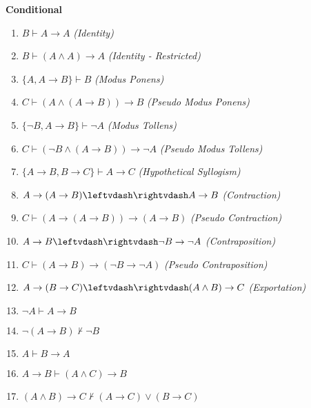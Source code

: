 
\noindent \textbf{Conditional}

\begin{enumerate}
\setcounter{enumi}{\value{enumi_saved}}
\item $ B\vdash  A \rightarrow  A $\hfill\emph{ (Identity)}  
\item $ B\vdash  (A \wedge  A) \rightarrow  A $\hfill\emph{ (Identity - Restricted)}  
\item $ \{A, A \rightarrow  B \} \vdash  B $\hfill\emph{ (Modus Ponens)}  
\item $ C\vdash  (A \wedge  (A \rightarrow  B)) \rightarrow  B $\hfill\emph{ (Pseudo Modus Ponens)}  
\item $ \{\neg B, A \rightarrow  B \} \vdash  \neg A $\hfill\emph{ (Modus Tollens)}  
\item $ C\vdash  (\neg B \wedge  (A \rightarrow  B)) \rightarrow  \neg A $\hfill\emph{ (Pseudo Modus Tollens)}  
\item $ \{A \rightarrow  B, B \rightarrow  C \} \vdash  A \rightarrow  C $\hfill\emph{ (Hypothetical Syllogism)}  
\item $ A \rightarrow  (A \rightarrow  B)\leftvdash\rightvdash  A \rightarrow  B $ \hfill\emph{ (Contraction)}  
\item $ C\vdash  (A \rightarrow  (A \rightarrow  B)) \rightarrow  (A \rightarrow  B) $\hfill\emph{ (Pseudo Contraction)}  
\item $ A \rightarrow  B\leftvdash\rightvdash  \neg B \rightarrow  \neg A $ \hfill\emph{ (Contraposition)}  
\item $ C\vdash  (A \rightarrow  B) \rightarrow  (\neg B \rightarrow  \neg A) $\hfill\emph{ (Pseudo Contraposition)}  
\item $ A \rightarrow  (B \rightarrow  C)\leftvdash\rightvdash  (A \wedge  B) \rightarrow  C $ \hfill\emph{ (Exportation)}  
\item $ \neg A\vdash  A \rightarrow  B $\hfill\emph{ }  
\item $ \neg (A \rightarrow  B)\nvdash  \neg B $\hfill\emph{ }  
\item $ A\vdash  B \rightarrow  A $\hfill\emph{ }  
\item $ A \rightarrow  B\vdash  (A \wedge  C) \rightarrow  B $\hfill\emph{ }  
\item $ (A \wedge  B) \rightarrow  C\nvdash  (A \rightarrow  C) \vee  (B \rightarrow  C) $\hfill\emph{ }  
\setcounter{enumi_saved}{\value{enumi}}
\end{enumerate}


